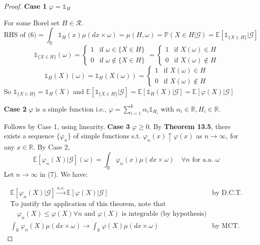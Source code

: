 \begin{proof}
\textbf{Case 1} \(\varphi = \mathbb{1}_H\)

For some Borel set \(H \in \mathcal{R}\).
\[
\text{RHS of (6)} = \int_{\mathbb{R}} \mathbb{1}_H(x) \mu(dx \times \omega) = \mu(H, \omega) = \mathbb{P}(X \in H | \mathcal{G}) = \mathbb{E} \left[ \mathbb{1}_{\{X \in H\}} | \mathcal{G} \right]
\]
\[
\mathbb{1}_{\{X \in H\}}(\omega) = 
\begin{cases} 
1 & \text{if } \omega \in \{X \in H\} \\ 
0 & \text{if } \omega \notin \{X \in H\} 
\end{cases} 
= \begin{cases} 
1 & \text{if } X(\omega) \in H \\ 
0 & \text{if } X(\omega) \notin H 
\end{cases}
\]
\[
\mathbb{1}_H(X)(\omega) = \mathbb{1}_H(X(\omega)) = 
\begin{cases} 
1 & \text{if } X(\omega) \in H \\ 
0 & \text{if } X(\omega) \notin H 
\end{cases}
\]
So \(\mathbb{1}_{\{X \in H\}} = \mathbb{1}_H(X)\) and \(\mathbb{E} \left[ \mathbb{1}_{\{X \in H\}} | \mathcal{G} \right] = \mathbb{E} \left[ \mathbb{1}_H(X) | \mathcal{G} \right] = \mathbb{E} \left[ \varphi(X) | \mathcal{G} \right]\)

\textbf{Case 2} \(\varphi\) is a simple function i.e., \(\varphi = \sum_{i=1}^k \alpha_i \mathbb{1}_{H_i}\) with \(\alpha_i \in \mathbb{R}, H_i \in \mathbb{R}\).

Follows by Case 1, using linearity.
\textbf{Case 3} \(\varphi \geq 0\). By \textbf{Theorem 13.5}, there exists a sequence \(\{\varphi_n\}\) of simple functions s.t. \(\varphi_n(x) \uparrow \varphi(x)\) as \(n \to \infty\), for any \(x \in \mathbb{R}\). By Case 2,
\[
\mathbb{E}[\varphi_n(X) | \mathcal{G}](\omega) = \int_{\mathbb{R}} \varphi_n(x) \mu(dx \times \omega) \quad \forall n \text{ for a.a. } \omega
\]
Let \(n \to \infty\) in (7). We have:

\[
\begin{array}{ll}
\mathbb{E}[\varphi_n(X) | \mathcal{G}] \xrightarrow{a.s.} \mathbb{E}[\varphi(X) | \mathcal{G}] & \text{by D.C.T.} \\
\text{To justify the application of this theorem, note that} & \\
\quad \varphi_n(X) \leq \varphi(X) \forall n \text{ and } \varphi(X) \text{ is integrable (by hypothesis)} & \\
\int_{\mathbb{R}} \varphi_n(X) \mu(dx \times \omega) \to \int_{\mathbb{R}} \varphi(X) \mu(dx \times \omega) & \text{by MCT.}
\end{array}
\]




\end{proof}
